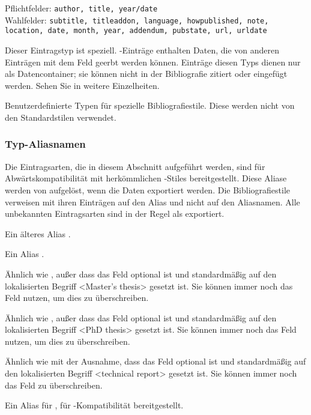 \documentclass{ltxdockit}[2011/03/25]
\begin{document}
\begin{typelist}
Pflichtfelder: \texttt{author, title, year/date}\\ Wahlfelder: \texttt{subtitle, 
titleaddon, language,
howpublished, note, location, date, month, year, addendum, pubstate, url,
urldate}


Dieser Eintragstyp ist speziell. -Einträge 
enthalten Daten,  die von anderen Einträgen mit dem Feld  
geerbt werden können.  Einträge diesen Typs dienen nur als Datencontainer; 
sie können nicht in der Bibliografie zitiert oder eingefügt werden. 
Sehen Sie in   weitere Einzelheiten.


Benutzerdefinierte Typen für spezielle Bibliografiestile. Diese werden nicht
von den Standardstilen verwendet. 

\end{typelist}

\subsubsection{Typ-Aliasnamen} \label{bib:typ:als}

Die Eintragsarten, die in diesem Abschnitt aufgeführt werden, sind für
Abwärtskompatibilität mit herkömmlichen \bibtex-Stiles bereitgestellt. Diese
Aliase werden von \bibtex aufgelöst, wenn die Daten exportiert werden. Die
Bibliografiestile verweisen mit ihren Einträgen auf den Alias und nicht auf den
Aliasnamen. Alle unbekannten Eintragsarten sind in der Regel als 
exportiert. 

\begin{typelist}

Ein älteres Alias .

Ein Alias .

Ähnlich wie , außer dass das Feld  optional ist
und standardmäßig auf den lokalisierten Begriff <Master's thesis> gesetzt ist.
Sie können immer noch das Feld  nutzen, um dies zu überschreiben.

Ähnlich wie , außer dass das Feld  optional ist
und standardmäßig auf den lokalisierten Begriff <PhD thesis> gesetzt ist. Sie
können immer noch das Feld  nutzen, um dies zu überschreiben.

Ähnlich wie  mit der Ausnahme, dass das Feld 
optional ist und standardmäßig auf den lokalisierten Begriff <technical report>
gesetzt ist. Sie können immer noch das Feld  zu überschreiben. 

Ein Alias für , für -Kompatibilität bereitgestellt. 

\end{typelist}
\end{document}

